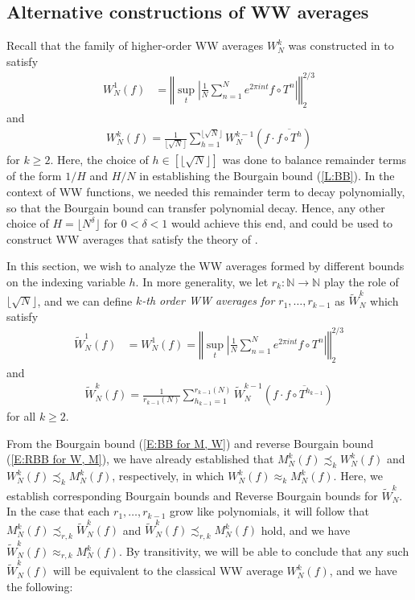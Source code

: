 \documentclass[11pt, oneside]{amsart}   	%
\newcommand{\1}{\mathbbm{1}}
\newcommand{\N}{\mathbb{N}}
\newcommand{\floor}[1]{\lfloor#1\rfloor}
\theoremstyle{definition}
\begin{document}
\subsection{Alternative constructions of WW averages}\label{S:Alt const}

Recall that the family of higher-order WW averages $W_N^k$ was constructed in \cite{assani2024higherorderwienerwintnersystems} to satisfy
\begin{align*}
W^1_N(f) &= \left\Vert \sup_{t}\left| \frac{1}{N}\sum_{n=1}^N e^{2\pi i n t} f\circ T^n \right| \right\Vert_2^{2/3}
\end{align*}
and 
\begin{align*}
W^{k}_N(f) = \frac{1}{\floor{\sqrt{N}}}\sum_{h=1}^{\floor{\sqrt{N}}} W^{k-1}_N \left( f \cdot \overline{f \circ T^{h}} \right)
\end{align*}
for $k\geq 2$. Here, the choice of $h\in [\floor{\sqrt{N}}]$ was done to balance remainder terms of the form $1/H$ and $H/N$ in establishing the Bourgain bound (\ref{L:BB}). In the context of WW functions, we needed this remainder term to decay polynomially, so that the Bourgain bound can transfer polynomial decay. Hence, any other choice of $H = \floor{N^\delta}$ for $0 < \delta < 1$ would achieve this end, and could be used to construct WW averages that satisfy the theory of \cite{assani2024higherorderwienerwintnersystems}.

In this section, we wish to analyze the WW averages formed by different bounds on the indexing variable $h$. In more generality, we let $r_k: \N \to \N$ play the role of $\floor{\sqrt{N}}$, and we can define \textit{$k$-th order WW averages for $r_1, \dots, r_{k-1}$} as $\widetilde{W}_N^k$ which satisfy
\begin{align*}
\widetilde{W}^1_N(f) &= W_N^1(f) = \left\Vert \sup_{t}\left| \frac{1}{N}\sum_{n=1}^N e^{2\pi i n t} f\circ T^n \right| \right\Vert_2^{2/3}
\end{align*}
and 
\begin{align*}
\widetilde{W}^{k}_N(f) = \frac{1}{r_{k-1}(N)}\sum_{h_{k-1}=1}^{r_{k-1}(N)} \widetilde W^{k-1}_N \left( f \cdot \overline{f \circ T^{h_{k-1}}} \right)
\end{align*}
for all $k\geq 2$. 

From the Bourgain bound (\ref{E:BB for M, W}) and reverse Bourgain bound (\ref{E:RBB for W, M}), we have already established that $M_N^k(f) \precsim_k W_N^k(f)$ and $W_N^k(f) \precsim_k M_N^k(f)$, respectively, in which $W_N^k(f) \approx_k M_N^k(f)$. Here, we establish corresponding Bourgain bounds and Reverse Bourgain bounds for $\widetilde{W}_N^k$. In the case that each $r_1, \dots, r_{k-1}$ grow like polynomials, it will follow that $M_N^k(f) \precsim_{r, k} \widetilde W_N^k(f)$ and  $\widetilde W_N^k(f) \precsim_{r, k} M_N^k(f)$ hold, and we have $\widetilde W_N^k(f) \approx_{r, k} M_N^k(f)$. By transitivity, we will be able to conclude that any such $\widetilde{W}_N^k(f)$ will be equivalent to the classical WW average $W_N^k(f)$, and we have the following:
\end{document}
